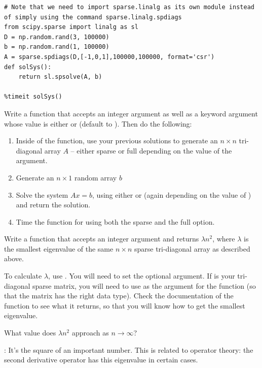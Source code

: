\begin{lstlisting}
# Note that we need to import sparse.linalg as its own module instead of simply using the command sparse.linalg.spdiags
from scipy.sparse import linalg as sl
D = np.random.rand(3, 100000)
b = np.random.rand(1, 100000)
A = sparse.spdiags(D,[-1,0,1],100000,100000, format='csr')
def solSys():
    return sl.spsolve(A, b)

%timeit solSys()

\end{lstlisting}


\begin{problem}
Write a function that accepts an integer argument  as well as a keyword argument  whose value is either  or  (default to ). Then do the following:
\begin{enumerate}
\item Inside of the function, use your previous solutions to generate an $n \times n$ tri-diagonal array $A$ -- either sparse or full depending on the value of the  argument.
\item Generate an $n \times 1$ random array $b$
\item Solve the system $Ax = b$, using either  or 
(again depending on the value of ) and return the solution.
\item Time the function for  using both the sparse and the full option.
\end{enumerate}
\end{problem}

\begin{problem}
Write a function that accepts an integer argument  and returns $\lambda n^2$, where
$\lambda$ is the smallest eigenvalue of the same $n \times n$ sparse tri-diagonal array as described above.

To calculate $\lambda$, use . You will need to set the 
optional argument. If  is your tri-diagonal sparse matrix, you will need to use
 as the argument for the  function (so that the matrix has the right data type).
Check the documentation of the  function to see what it returns, so that you will know how to
get the smallest eigenvalue.

What value does $\lambda n^2$ approach as $n \rightarrow \infty$?

: It's the square of an important number.
This is related to operator theory: the second derivative operator has this eigenvalue in certain cases.
\end{problem}

